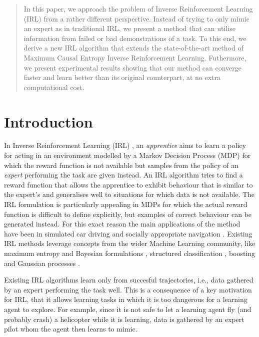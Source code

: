\documentclass[conference]{IEEEtran}
\begin{document}
\begin{abstract}
In this paper, we approach the problem of Inverse Reinforcement Learning (IRL) from a rather different perspective. Instead of trying to only mimic an expert as in 
traditional IRL, we present a method that can utilise information from failed or bad demonstrations of a task. To this end, we derive a new IRL algorithm that extends the state-of-the-art method of Maximum Causal Entropy Inverse Reinforcement Learning.  Futhermore, we present experimental results showing that our method can converge faster and learn better than its original counterpart, at no extra computational cost. 
\end{abstract}

\IEEEpeerreviewmaketitle

\section{Introduction}
In Inverse Reinforcement Learning (IRL) \cite{ng2000algorithms}, an \emph{apprentice} aims to learn a policy for acting in an environment modelled by a Markov Decision Process (MDP) for which the reward function is not available but samples from the policy of an \emph{expert} performing the task are given instead. An IRL algorithm tries to find a reward function that allows the apprentice to exhibit behaviour  that is similar to the expert's and generalises well to situations for which data is not available. The IRL formulation is particularly appealing in MDPs for which the actual reward function is difficult to define explicitly, but examples of correct behaviour can be generated instead. For this exact reason the main applications of the method have been in simulated car driving \cite{abbeel2004apprenticeship} and socially appropriate navigation \cite{henry2010learning,vasquez2014inverse}. Existing IRL methods leverage concepts from the wider Machine Learning community, like maximum entropy \cite{ziebart2008maximum} and Bayesian formulations \cite{ramachandran2007bayesian}, structured classification \cite{ratliff2006maximum}, boosting \cite{ratliff2007boosting} and Gaussian processes \cite{levine2011nonlinear}.

Existing IRL algorithms learn only from succesful trajectories, i.e., data gathered by an expert performing the task well.  This is a consequence of a key motivation for IRL, that it allows learning tasks in which it is too dangerous for a learning agent to explore.  For example, since it is not safe to let a learning agent fly (and probably crash) a helicopter while it is learning, data is gathered by an expert pilot whom the agent then learns to mimic. 
\end{document}
